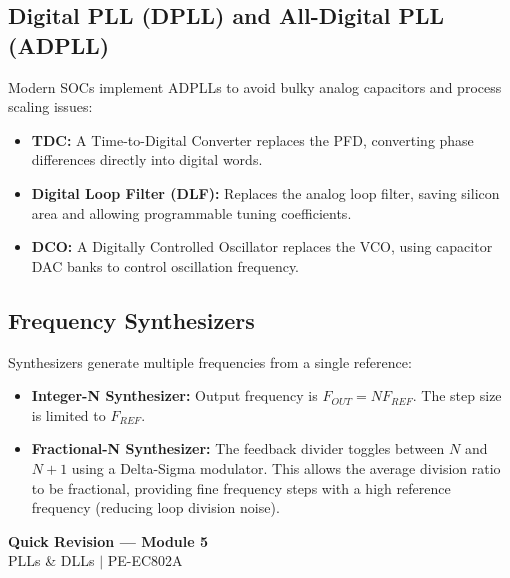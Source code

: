 \documentclass[12pt,a4paper]{article}
\begin{document}
\subsection{Digital PLL (DPLL) and All-Digital PLL (ADPLL)}
Modern SOCs implement ADPLLs to avoid bulky analog capacitors and process scaling issues:
\begin{itemize}[leftmargin=*, itemsep=2pt]
  \item \textbf{TDC:} A Time-to-Digital Converter replaces the PFD, converting phase differences directly into digital words.
  \item \textbf{Digital Loop Filter (DLF):} Replaces the analog loop filter, saving silicon area and allowing programmable tuning coefficients.
  \item \textbf{DCO:} A Digitally Controlled Oscillator replaces the VCO, using capacitor DAC banks to control oscillation frequency.
\end{itemize}

\subsection{Frequency Synthesizers}
Synthesizers generate multiple frequencies from a single reference:
\begin{itemize}[leftmargin=*, itemsep=2.5pt]
  \item \textbf{Integer-N Synthesizer:} Output frequency is $F_{OUT} = N F_{REF}$. The step size is limited to $F_{REF}$.
  \item \textbf{Fractional-N Synthesizer:} The feedback divider toggles between $N$ and $N+1$ using a Delta-Sigma modulator. This allows the average division ratio to be fractional, providing fine frequency steps with a high reference frequency (reducing loop division noise).
\end{itemize}

\newpage
\begin{center}
  {\large\bfseries\color{myred} Quick Revision --- Module 5}\\[3pt]
  {\small\color{mydark} PLLs \& DLLs $|$ PE-EC802A}
\end{center}
\noindent{\color{myred}\rule{\linewidth}{1.2pt}}
\vspace{4pt}
\end{document}

